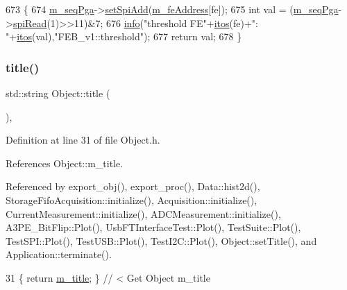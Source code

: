 \begin{DoxyCode}
673                              \{
674   \hyperlink{classFEB__v1_a6c7804ac86796f233a8393043adf2e77}{m\_seqPga}->\hyperlink{classSeqPGA_ac998ce3a6d9b5f2e88cc8393f8c1df53}{setSpiAdd}(\hyperlink{classFEB__v1_a4e1945c2d5b434125f375e9d0fc6d99f}{m\_feAddress}[fe]);
675   \textcolor{keywordtype}{int} val = (\hyperlink{classFEB__v1_a6c7804ac86796f233a8393043adf2e77}{m\_seqPga}->\hyperlink{classSeqPGA_ab3d0e5e5d4014bc7a92588a76b8713d4}{spiRead}(1)>>11)&7;
676   \hyperlink{classObject_a644fd329ea4cb85f54fa6846484b84a8}{info}(\textcolor{stringliteral}{"threshold FE"}+\hyperlink{Tools_8h_af330027dbdafb9a30768b3613c553e60}{itos}(fe)+\textcolor{stringliteral}{": "}+\hyperlink{Tools_8h_af330027dbdafb9a30768b3613c553e60}{itos}(val),\textcolor{stringliteral}{"FEB\_v1::threshold"});
677   \textcolor{keywordflow}{return} val;
678 \}
\end{DoxyCode}
\mbox{\label{classObject_a73a0f1a41828fdd8303dd662446fb6c3}} 
\subsubsection{\texorpdfstring{title()}{title()}}
{\footnotesize\ttfamily std\+::string Object\+::title (\begin{DoxyParamCaption}{ }\end{DoxyParamCaption})\hspace{0.3cm}{\ttfamily [inline]}, {\ttfamily [inherited]}}



Definition at line 31 of file Object.\+h.



References Object\+::m\+\_\+title.



Referenced by export\+\_\+obj(), export\+\_\+proc(), Data\+::hist2d(), Storage\+Fifo\+Acquisition\+::initialize(), Acquisition\+::initialize(), Current\+Measurement\+::initialize(), A\+D\+C\+Measurement\+::initialize(), A3\+P\+E\+\_\+\+Bit\+Flip\+::\+Plot(), Usb\+F\+T\+Interface\+Test\+::\+Plot(), Test\+Suite\+::\+Plot(), Test\+S\+P\+I\+::\+Plot(), Test\+U\+S\+B\+::\+Plot(), Test\+I2\+C\+::\+Plot(), Object\+::set\+Title(), and Application\+::terminate().


\begin{DoxyCode}
31 \{ \textcolor{keywordflow}{return} \hyperlink{classObject_affbeea1953eb5163573b92fad8f75727}{m\_title};      \} \textcolor{comment}{// < Get Object m\_title}
\end{DoxyCode}
\mbox{\label{classHierarchy_a76e914b9a677a22a82deb74d892bf261}} 
